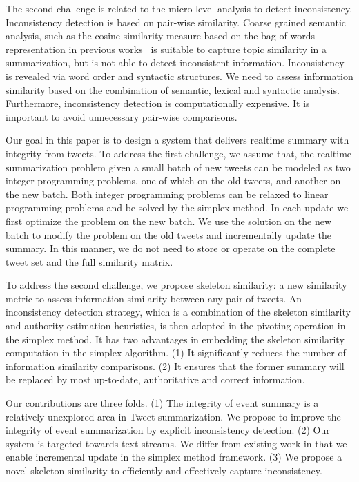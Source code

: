 \documentclass{llncs}
\begin{document}
The second challenge is related to the micro-level analysis to detect inconsistency. Inconsistency detection is based on pair-wise similarity. Coarse grained semantic analysis, such as the cosine similarity measure based on the bag of words representation in previous works~\cite{} is suitable to capture topic similarity in a summarization, but is not able to detect inconsistent information. Inconsistency is revealed via word order and syntactic structures. We need to assess information similarity based on the combination of semantic, lexical and syntactic analysis. Furthermore, inconsistency detection is computationally expensive. It is important to avoid unnecessary pair-wise comparisons.

Our goal in this paper is to design a system that delivers realtime summary with integrity from tweets. To address the first challenge, we assume that, the realtime summarization problem given a small batch of new tweets can be modeled as two integer programming problems, one of which on the old tweets, and another on the new batch. Both integer programming problems can be relaxed to linear programming problems and be solved by the simplex method. In each update we first optimize the problem on the new batch. We use the solution on the new batch to modify the problem on the old tweets and incrementally update the summary.  In this manner, we do not need to store or operate on the complete tweet set and the full similarity matrix.


To address the second challenge, we propose skeleton similarity: a new similarity metric to assess information similarity between any pair of tweets. An inconsistency detection strategy, which is a combination of the skeleton similarity and authority estimation heuristics, is then adopted in the pivoting operation in the simplex method. It has two advantages in embedding the skeleton similarity computation in the simplex algorithm. (1) It significantly reduces the number of information similarity comparisons. (2) It ensures that the former summary will be replaced by most up-to-date, authoritative and correct information.


Our contributions are three folds. (1) The integrity of event summary is a relatively unexplored area in Tweet summarization. We propose to improve the integrity of event summarization by explicit inconsistency detection. (2) Our system is targeted towards text streams. We differ from existing work in that we enable incremental update in the simplex method framework. (3) We propose a novel skeleton similarity to efficiently and effectively capture inconsistency.
\end{document}
